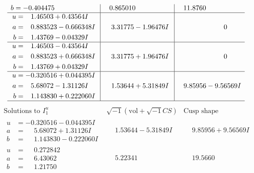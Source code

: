 \documentclass[1p]{elsarticle_modified}
\theoremstyle{definition}
\newcommand{\I}{\sqrt{-1}}
\begin{document}
$$\begin{array}{c|c|c}
\begin{aligned}
b &= -0.404475\phantom{ +0.000000I}\end{aligned}
 & \phantom{-}0.865010\phantom{ +0.000000I} & \phantom{-}11.8760\phantom{ +0.000000I} \\ \hline\begin{aligned}
u &= \phantom{-}1.46503 + 0.43564 I \\
a &= \phantom{-}0.883523 - 0.666348 I \\
b &= \phantom{-}1.43769 - 0.04329 I\end{aligned}
 & \phantom{-}3.31775 - 1.96476 I & \phantom{-0.000000 } 0 \\ \hline\begin{aligned}
u &= \phantom{-}1.46503 - 0.43564 I \\
a &= \phantom{-}0.883523 + 0.666348 I \\
b &= \phantom{-}1.43769 + 0.04329 I\end{aligned}
 & \phantom{-}3.31775 + 1.96476 I & \phantom{-0.000000 } 0 \\ \hline\begin{aligned}
u &= -0.320516 + 0.044395 I \\
a &= \phantom{-}5.68072 - 1.31126 I \\
b &= \phantom{-}1.143830 + 0.222060 I\end{aligned}
 & \phantom{-}1.53644 + 5.31849 I & \phantom{-}9.85956 - 9.56569 I\\
 \hline 
 \end{array}$$\newpage$$\begin{array}{c|c|c}  
\text{Solutions to }I^u_{1}& \I (\text{vol} + \sqrt{-1}CS) & \text{Cusp shape}\\
 \hline 
\begin{aligned}
u &= -0.320516 - 0.044395 I \\
a &= \phantom{-}5.68072 + 1.31126 I \\
b &= \phantom{-}1.143830 - 0.222060 I\end{aligned}
 & \phantom{-}1.53644 - 5.31849 I & \phantom{-}9.85956 + 9.56569 I \\ \hline\begin{aligned}
u &= \phantom{-}0.272842\phantom{ +0.000000I} \\
a &= \phantom{-}6.43062\phantom{ +0.000000I} \\
b &= \phantom{-}1.21750\phantom{ +0.000000I}\end{aligned}
 & \phantom{-}5.22341\phantom{ +0.000000I} & \phantom{-}19.5660\phantom{ +0.000000I} \\ \hline\begin{aligned}

\end{aligned}
\end{array}$$
\end{document}
